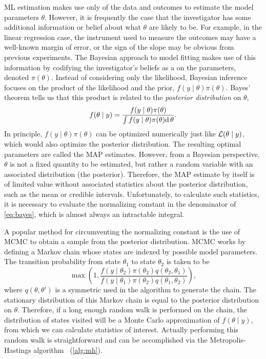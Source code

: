 \Gls{ML} estimation makes use only of the data and outcomes to estimate the
model parameters $\theta$. However, it is frequently the case that the
investigator has some additional information or belief about what $\theta$ are
likely to be. For example, in the linear regression case, the instrument used
to measure the outcomes may have a well-known margin of error, or the sign of
the slope may be obvious from previous experiments. The Bayesian approach to
model fitting makes use of this information by codifying the investigator's
beliefs as a  on the parameters, denoted
$\pi(\theta)$. Instead of considering only the likelihood, Bayesian inference
focuses on the product of the likelihood and the prior, $f(y \mid \theta)
\pi(\theta)$. Bayes' theorem tells us that this product is related to the
\textit{posterior distribution} on $\theta$,
\begin{align}
  f(\theta \mid y) 
    = \frac{f(y \mid \theta) \pi(\theta)}
           {\int f(y \mid \theta) \pi(\theta) \mathrm{d}\, \theta}.
  \label{eq:bayes}
\end{align}
In principle, $f(y \mid \theta) \pi(\theta)$ can be optimized numerically just
like $\mathcal{L}(\theta \mid y)$, which would also optimize the posterior distribution.
The resulting optimal parameters are called the \gls{MAP} estimates. However,
from a Bayesian perspective, $\theta$ is not a fixed quantity to be estimated,
but rather a random variable with an associated distribution (the posterior).
Therefore, the \gls{MAP} estimate by itself is of limited value without
associated statistics about the posterior distribution, such as the mean or
credible intervals. Unfortunately, to calculate such statistics, it is
necessary to evaluate the normalizing constant in the denominator of
\cref{eq:bayes}, which is almost always an intractable integral.

A popular method for circumventing the normalizing constant is the use of
\gls{MCMC} to obtain a sample from the posterior distribution. \Gls{MCMC} works
by defining a Markov chain whose states are indexed by possible model
parameters. The transition probability from state $\theta_1$ to state
$\theta_2$ is taken to be
\[
  \max\left(1, \frac{f(y \mid \theta_2) \pi(\theta_2) q(\theta_2, \theta_1)}
                    {f(y \mid \theta_1) \pi(\theta_2) q(\theta_1, \theta_2)} \right),
\]
where $q(\theta, \theta')$ is a symmetric  used in
the algorithm to generate the chain. The stationary distribution of this Markov
chain is equal to the posterior distribution on $\theta$. Therefore, if a long
enough random walk is performed on the chain, the distribution of states
visited will be a Monte Carlo approximation of $f(\theta \mid y)$, from
which we can calculate statistics of interest. Actually performing this random
walk is straightforward and can be accomplished via the Metropolis-Hastings
algorithm~\autocite{metropolis1953equation,hastings1970monte} (\cref{alg:mh}).


